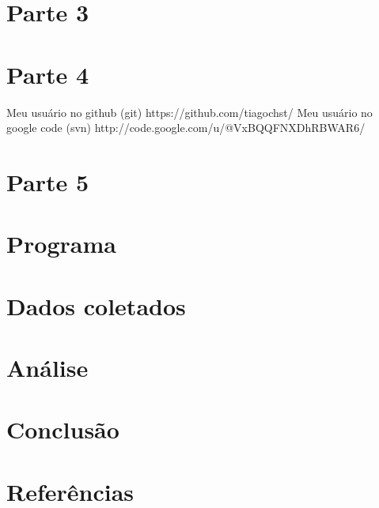\documentclass[11pt,a4paper]{article}
\begin{document}
\section{Parte 3}
\section{Parte 4}
Meu usuário no github (git) https://github.com/tiagochst/
Meu usuário no google code (svn) http://code.google.com/u/@VxBQQFNXDhRBWAR6/
\section{Parte 5}

\section{Programa}
\section{Dados coletados}

\section{Análise}


\section{Conclusão}
 \section{Referências}

\begin{small}
  
\end{small}
\end{document}
